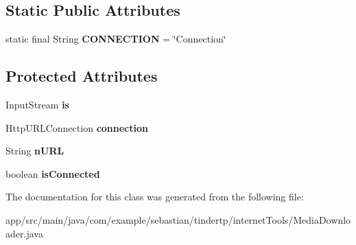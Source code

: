 \subsection*{Static Public Attributes}
\begin{DoxyCompactItemize}
\item 
static final String {\bfseries C\+O\+N\+N\+E\+C\+T\+I\+ON} = \char`\"{}Connection\char`\"{}\hypertarget{classcom_1_1example_1_1sebastian_1_1tindertp_1_1internetTools_1_1MediaDownloader_a482dd76e7ba14df66401239e5a22d0aa}{}\label{classcom_1_1example_1_1sebastian_1_1tindertp_1_1internetTools_1_1MediaDownloader_a482dd76e7ba14df66401239e5a22d0aa}

\end{DoxyCompactItemize}
\subsection*{Protected Attributes}
\begin{DoxyCompactItemize}
\item 
Input\+Stream {\bfseries is}\hypertarget{classcom_1_1example_1_1sebastian_1_1tindertp_1_1internetTools_1_1MediaDownloader_a2da895fd09c334a916b380bb72c00228}{}\label{classcom_1_1example_1_1sebastian_1_1tindertp_1_1internetTools_1_1MediaDownloader_a2da895fd09c334a916b380bb72c00228}

\item 
Http\+U\+R\+L\+Connection {\bfseries connection}\hypertarget{classcom_1_1example_1_1sebastian_1_1tindertp_1_1internetTools_1_1MediaDownloader_ae965d0e25e863d047969906d6fbdb8cc}{}\label{classcom_1_1example_1_1sebastian_1_1tindertp_1_1internetTools_1_1MediaDownloader_ae965d0e25e863d047969906d6fbdb8cc}

\item 
String {\bfseries n\+U\+RL}\hypertarget{classcom_1_1example_1_1sebastian_1_1tindertp_1_1internetTools_1_1MediaDownloader_a32eb38999d65233da4a1b95612dcec6d}{}\label{classcom_1_1example_1_1sebastian_1_1tindertp_1_1internetTools_1_1MediaDownloader_a32eb38999d65233da4a1b95612dcec6d}

\item 
boolean {\bfseries is\+Connected}\hypertarget{classcom_1_1example_1_1sebastian_1_1tindertp_1_1internetTools_1_1MediaDownloader_a5d53f555b658c0d72145ccd7a20f61dd}{}\label{classcom_1_1example_1_1sebastian_1_1tindertp_1_1internetTools_1_1MediaDownloader_a5d53f555b658c0d72145ccd7a20f61dd}

\end{DoxyCompactItemize}


The documentation for this class was generated from the following file\+:\begin{DoxyCompactItemize}
\item 
app/src/main/java/com/example/sebastian/tindertp/internet\+Tools/Media\+Downloader.\+java\end{DoxyCompactItemize}
